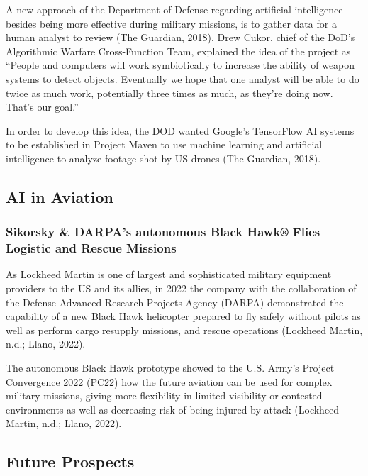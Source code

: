 \documentclass[
]{article}
\begin{document}
A new approach of the Department of Defense regarding artificial intelligence besides being more effective during military missions, is to gather data for a human analyst to review (The Guardian, 2018). Drew Cukor, chief of the DoD's Algorithmic Warfare Cross-Function Team, explained the idea of the project as ``People and computers will work symbiotically to increase the ability of weapon systems to detect objects. Eventually we hope that one analyst will be able to do twice as much work, potentially three times as much, as they're doing now. That's our goal.''

In order to develop this idea, the DOD wanted Google's TensorFlow AI systems to be established in Project Maven to use machine learning and artificial intelligence to analyze footage shot by US drones (The Guardian, 2018).

\hypertarget{ai-in-aviation}{%
\subsection{AI in Aviation}\label{ai-in-aviation}}

\hypertarget{sikorsky-darpas-autonomous-black-hawk-flies-logistic-and-rescue-missions}{%
\subsubsection{Sikorsky \& DARPA's autonomous Black Hawk® Flies Logistic and Rescue Missions}\label{sikorsky-darpas-autonomous-black-hawk-flies-logistic-and-rescue-missions}}

As Lockheed Martin is one of largest and sophisticated military equipment providers to the US and its allies, in 2022 the company with the collaboration of the Defense Advanced Research Projects Agency (DARPA) demonstrated the capability of a new Black Hawk helicopter prepared to fly safely without pilots as well as perform cargo resupply missions, and rescue operations (Lockheed Martin, n.d.; Llano, 2022).

The autonomous Black Hawk prototype showed to the U.S. Army's Project Convergence 2022 (PC22) how the future aviation can be used for complex military missions, giving more flexibility in limited visibility or contested environments as well as decreasing risk of being injured by attack (Lockheed Martin, n.d.; Llano, 2022).

\hypertarget{future-prospects}{%
\subsection{Future Prospects}\label{future-prospects}}
\end{document}
